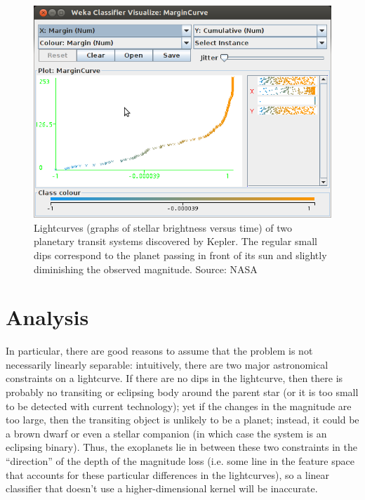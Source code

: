 \documentclass{amsart}
\begin{document}
	\begin{figure}
	\centering
	\label{multilayer}
	\includegraphics[width=6in]{multilayer_perceptron}
	\caption{Lightcurves (graphs of stellar brightness versus time) of two planetary transit systems discovered by Kepler. The regular small dips correspond to the planet passing in front of its sun and slightly diminishing the observed magnitude. Source: NASA}%
	\end{figure}
	

\section{Analysis}


In particular, there are good reasons to assume that the problem is not necessarily linearly separable: intuitively, there are two major astronomical constraints on a lightcurve. If there are no dips in the lightcurve, then there is probably no transiting or eclipsing body around the parent star (or it is too small to be detected with current technology); yet if the changes in the magnitude are too large, then the transiting object is unlikely to be a planet; instead, it could be a brown dwarf or even a stellar companion (in which case the system is an eclipsing binary). Thus, the exoplanets lie in between these two constraints in the ``direction'' of the depth of the magnitude loss (i.e. some line in the feature space that accounts for these particular differences in the lightcurves), so a linear classifier that doesn't use a higher-dimensional kernel will be inaccurate.
\end{document}
